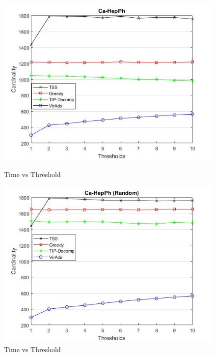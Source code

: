 \begin{figure}[h!]
\begin{minipage}[t]{0.50\textwidth}
\includegraphics[width=\linewidth,keepaspectratio=true]{images/ca-hepphtime.jpg}
\caption{Time vs Threshold}
\label{fase1}
\end{minipage}
\begin{minipage}[t]{0.50\textwidth}
\includegraphics[width=\linewidth,keepaspectratio=true]{images/ca-hepphrandomtime.jpg}
\caption{Time vs Threshold}
\end{minipage}
\end{figure}

